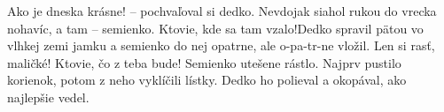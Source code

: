 \documentclass[10pt,twocolumn,twoside,slovak,a4paper]{article}
\begin{document}
Ako je dneska krásne! – pochvaľoval si dedko. Nevdojak siahol rukou do vrecka nohavíc, a tam – semienko. Ktovie, kde sa tam vzalo!Dedko spravil pätou vo vlhkej zemi jamku a semienko do nej opatrne, ale o-pa-tr-ne vložil.
Len si rasť, maličké! Ktovie, čo z teba bude!
Semienko utešene rástlo. Najprv pustilo korienok, potom z neho vyklíčili lístky. Dedko ho polieval a okopával, ako najlepšie vedel.
\end{document}
